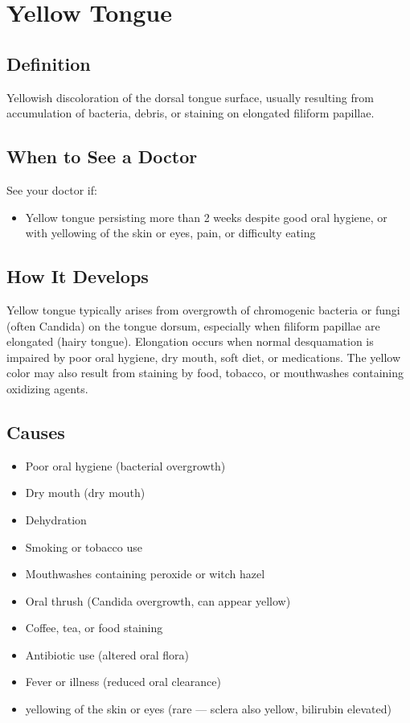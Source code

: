 \chapter{Yellow Tongue}

\section*{Definition}
Yellowish discoloration of the dorsal tongue surface, usually resulting from accumulation of bacteria, debris, or staining on elongated filiform papillae.

\section*{When to See a Doctor}
See your doctor if:
\begin{itemize}
  \item Yellow tongue persisting more than 2 weeks despite good oral hygiene, or with yellowing of the skin or eyes, pain, or difficulty eating
\end{itemize}

\section*{How It Develops}
Yellow tongue typically arises from overgrowth of chromogenic bacteria or fungi (often Candida) on the tongue dorsum, especially when filiform papillae are elongated (hairy tongue). Elongation occurs when normal desquamation is impaired by poor oral hygiene, dry mouth, soft diet, or medications. The yellow color may also result from staining by food, tobacco, or mouthwashes containing oxidizing agents.

\section*{Causes}
\begin{itemize}
  \item Poor oral hygiene (bacterial overgrowth)
  \item Dry mouth (dry mouth)
  \item Dehydration
  \item Smoking or tobacco use
  \item Mouthwashes containing peroxide or witch hazel
  \item Oral thrush (Candida overgrowth, can appear yellow)
  \item Coffee, tea, or food staining
  \item Antibiotic use (altered oral flora)
  \item Fever or illness (reduced oral clearance)
  \item yellowing of the skin or eyes (rare — sclera also yellow, bilirubin elevated)
\end{itemize}

